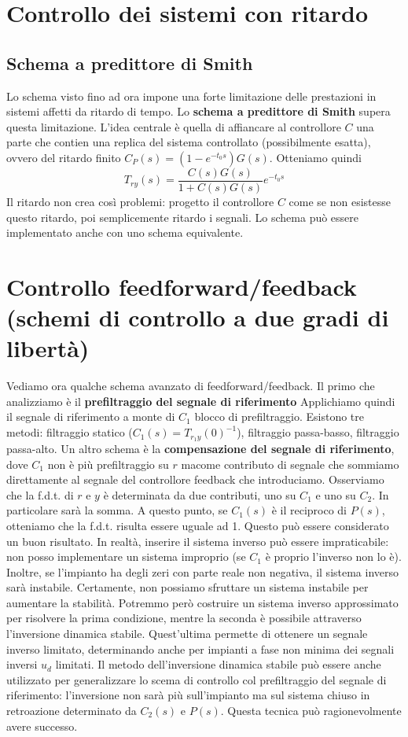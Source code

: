 \documentclass[11pt]{article}
\begin{document}
\section{Controllo dei sistemi con ritardo}
\subsection{Schema a predittore di Smith}
Lo schema visto fino ad ora impone una forte limitazione delle prestazioni in sistemi affetti da ritardo di tempo. Lo \textbf{schema a predittore di Smith} supera questa limitazione. L'idea centrale è quella di affiancare al controllore $C$ una parte che contien una replica del sistema controllato (possibilmente esatta), ovvero del ritardo finito $C_P(s)=(1-e^{-t_0s})G(s)$. Otteniamo quindi
\begin{displaymath}
    T_{ry}(s)=\frac{C(s)G(s)}{1+C(s)G(s)}e^{-t_0s}
\end{displaymath}
Il ritardo non crea così problemi: progetto il controllore $C$ come se non esistesse questo ritardo, poi semplicemente ritardo i segnali. Lo schema può essere implementato anche con uno schema equivalente.
\section{Controllo feedforward/feedback (schemi di controllo a due gradi di libertà)}
Vediamo ora qualche schema avanzato di feedforward/feedback. Il primo che analizziamo è il \textbf{prefiltraggio del segnale di riferimento}
Applichiamo quindi il segnale di riferimento a monte di $C_1$ blocco di prefiltraggio. Esistono tre metodi: filtraggio statico ($C_1(s)=T_{r_1y}(0)^{-1}$), filtraggio passa-basso, filtraggio passa-alto. Un altro schema è la \textbf{compensazione del segnale di riferimento}, dove $C_1$ non è più prefiltraggio su $r$ macome contributo di segnale che sommiamo direttamente al segnale del controllore feedback che introduciamo. Osserviamo che la f.d.t. di $r$ e $y$ è determinata da due contributi, uno su $C_1$ e uno su $C_2$. In particolare sarà la somma. A questo punto, se $C_1(s)$ è il reciproco di $P(s)$, otteniamo che la f.d.t. risulta essere uguale ad 1. Questo può essere considerato un buon risultato. In realtà, inserire il sistema inverso può essere impraticabile: non posso implementare un sistema improprio (se $C_1$ è proprio l'inverso non lo è). Inoltre, se l'impianto ha degli zeri con parte reale non negativa, il sistema inverso sarà instabile. Certamente, non possiamo sfruttare un sistema instabile per aumentare la stabilità.
Potremmo però costruire un sistema inverso approssimato per risolvere la prima condizione, mentre la seconda è possibile attraverso l'inversione dinamica stabile.
Quest'ultima permette di ottenere un segnale inverso limitato, determinando anche per impianti a fase non minima dei segnali inversi $u_d$ limitati. Il metodo dell'inversione dinamica stabile può essere anche utilizzato per generalizzare lo scema di controllo col prefiltraggio del segnale di riferimento: l'inversione non sarà più sull'impianto ma sul sistema chiuso in retroazione determinato da $C_2(s)$ e $P(s)$. Questa tecnica può ragionevolmente avere successo.
\end{document}
